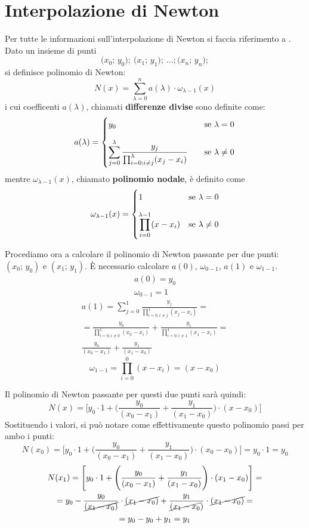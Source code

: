 \section{Interpolazione di Newton}

Per tutte le informazioni sull'interpolazione di Newton si faccia riferimento a \parencite[85]{info}. Dato un insieme di punti
\[
\big(x_0;\,y_0\big);\:\big(x_1;\,y_1\big);\:\dots;\big(x_n;\,y_n\big);
\]
si definisce polinomio di Newton:
\begin{equation}
N(x)=\sum_{\lambda=0}^n a(\lambda)\cdot \omega_{\lambda-1}(x)
\end{equation}
i cui coefficenti $a(\lambda)$, chiamati \textbf{differenze divise} sono definite come:
\[
a(\lambda)=\begin{cases}
y_0\quad&\text{se }\lambda=0\vspace{1em}\\
\displaystyle\sum_{j=0}^{\lambda}\frac{y_j}{\prod_{i=0; i\neq j}^{\lambda}(x_j-x_i)}\quad&\text{se }\lambda\neq 0
\end{cases}
\]
mentre $\omega_{\lambda-1}(x)$, chiamato \textbf{polinomio nodale}, è definito come
\[
\omega_{\lambda-1}(x)=\begin{cases}
1\quad&\text{se }\lambda=0\vspace{1em}\\
\displaystyle\prod_{i=0}^{\lambda-1}(x-x_i)&\text{se }\lambda\neq0
\end{cases}
\]

Procediamo ora a calcolare il polinomio di Newton passante per due punti: $(x_0;\,y_0)$ e $(x_1;\,y_1)$. È necessario calcolare $a(0)$, $\omega_{0-1}$, $a(1)$ e $\omega_{1-1}$.
\begin{gather*}
a(0)=y_0\\
\omega_{0-1}=1
\end{gather*}
\begin{multline*}
a(1)=\displaystyle\sum_{j=0}^{1}\frac{y_j}{\prod_{i=0; i\neq j}^{1}(x_j-x_i)}=\\
=\frac{y_0}{\prod_{i=0; i\neq 0}^{1}(x_0-x_i)}+\frac{y_1}{\prod_{i=0; i\neq 1}^{1}(x_1-x_i)}=\\
\frac{y_0}{(x_0-x_1)}+\frac{y_1}{(x_1-x_0)}
\end{multline*}
\[
\omega_{1-1}=\displaystyle\prod_{i=0}^{0}(x-x_i)=(x-x_0)
\]

Il polinomio di Newton passante per questi due punti sarà quindi:
\[
N(x)=\Bigg[y_0\cdot1+\Bigg(\frac{y_0}{(x_0-x_1)}+\frac{y_1}{(x_1-x_0)}\Bigg)\cdot(x-x_0)\Bigg]
\]
Sostituendo i valori, si può notare come effettivamente questo polinomio passi per ambo i punti:
\[
N(x_0)=\Bigg[y_0\cdot1+\Bigg(\frac{y_0}{(x_0-x_1)}+\frac{y_1}{(x_1-x_0)}\Bigg)\cdot(x_0-x_0)\Bigg]=y_0\cdot1=y_0
\]
\begin{multline*}
N(x_1)=\Bigg[y_0\cdot1+\Bigg(\frac{y_0}{(x_0-x_1)}+\frac{y_1}{(x_1-x_0)}\Bigg)\cdot(x_1-x_0)\Bigg]=\\
=y_0-\frac{y_0}{\cancel{(x_1-x_0)}}\cdot\cancel{(x_1-x_0)}+\frac{y_1}{\cancel{(x_1-x_0})}\cdot\cancel{(x_1-x_0)}=\\
=y_0-y_0+y_1=y_1
\end{multline*}

